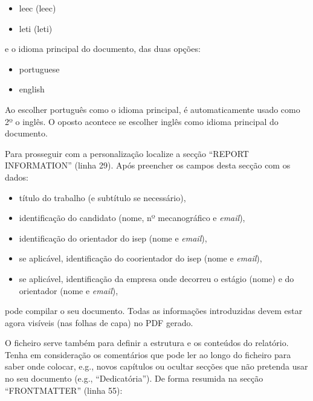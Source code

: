 \begin{itemize}
\item \acs{leec} (\acl{leec})
\item \acs{leti} (\acl{leti})
\end{itemize}
\newpage
\noindent e o idioma principal do documento, das duas opções: 
\begin{itemize}
\item portuguese 
\item english
\end{itemize}

Ao escolher português como o idioma principal, é automaticamente usado como 2º o inglês. O oposto acontece se escolher inglês como idioma principal do documento. 

Para prosseguir com a personalização localize a secção ``REPORT INFORMATION'' (linha 29). Após preencher os campos desta secção com os dados:

\begin{itemize}
\item título do trabalho (e subtítulo se necessário),
\item identificação do candidato (nome, nº mecanográfico e \textit{email}),
\item identificação do orientador do \ac{isep} (nome e \textit{email}),
\item se aplicável, identificação do coorientador do \ac{isep} (nome e \textit{email}),
\item se aplicável, identificação da empresa onde decorreu o estágio (nome) e do orientador (nome e \textit{email}), 
\end{itemize}

\noindent pode compilar o seu documento. Todas as informações introduzidas devem estar agora visíveis (nas folhas de capa) no PDF gerado.

O ficheiro  serve também para definir a estrutura e os conteúdos do relatório. Tenha em consideração os comentários que pode ler ao longo do ficheiro para saber onde colocar, e.g., novos capítulos ou ocultar secções que não pretenda usar no seu documento (e.g., ``Dedicatória''). De forma resumida na secção ``FRONTMATTER'' (linha 55):

